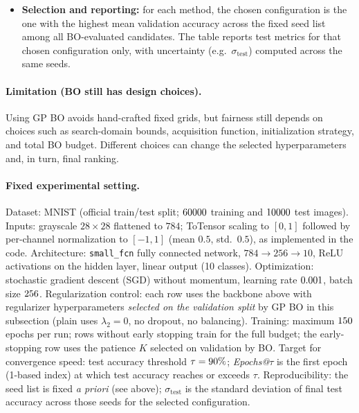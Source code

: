 \begin{itemize}
  \item \textbf{Selection and reporting:} for each method, the chosen configuration is the one with the highest mean validation accuracy across the fixed seed list among all BO-evaluated candidates. The table reports test metrics for that chosen configuration only, with uncertainty (e.g.\ $\sigma_{\mathrm{test}}$) computed across the same seeds.
\end{itemize}

\paragraph{Limitation (BO still has design choices).}
Using GP BO avoids hand-crafted fixed grids, but fairness still depends on choices such as search-domain bounds, acquisition function, initialization strategy, and total BO budget. Different choices can change the selected hyperparameters and, in turn, final ranking.

\paragraph{Fixed experimental setting.}
Dataset: MNIST (official train/test split; $60000{}$ training and $10000{}$ test images).
Inputs: grayscale $28\!\times\!28$ flattened to $784$; ToTensor scaling to $[0,1]$ followed by per-channel normalization to $[-1,1]$ (mean $0.5$, std.\ $0.5$), as implemented in the code.
Architecture: \texttt{small\_fcn} fully connected network, $784 \rightarrow 256 \rightarrow 10$, ReLU activations on the hidden layer, linear output (10 classes).
Optimization: stochastic gradient descent (SGD) without momentum, learning rate $0.001$, batch size $256$.
Regularization control: each row uses the backbone above with regularizer hyperparameters \emph{selected on the validation split} by GP BO in this subsection (plain uses $\lambda_2=0$, no dropout, no balancing).
Training: maximum $150$ epochs per run; rows without early stopping train for the full budget; the early-stopping row uses the patience $K$ selected on validation by BO.
Target for convergence speed: test accuracy threshold $\tau = 90\%$; \emph{Epochs@$\tau$} is the first epoch (1-based index) at which test accuracy reaches or exceeds $\tau$.
Reproducibility: the seed list is fixed \emph{a priori} (see above); $\sigma_{\mathrm{test}}$ is the standard deviation of final test accuracy across those seeds for the selected configuration.



